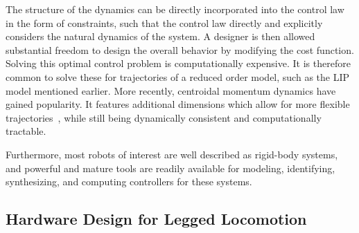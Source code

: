 The structure of the dynamics can be directly incorporated into the control law in the form of constraints, such that the control law directly and explicitly considers the natural dynamics of the system.
A designer is then allowed substantial freedom to design the overall behavior by modifying the cost function.
Solving this optimal control problem is computationally expensive. It is therefore common to solve these for trajectories of a reduced order model, such as the LIP model mentioned earlier. More recently, centroidal momentum dynamics have gained popularity. It features additional dimensions which allow for more flexible trajectories~\cite{dai2014whole,koolen2016balance,ponton2016convex}, while still being dynamically consistent and computationally tractable.

Furthermore, most robots of interest are well described as rigid-body systems, and powerful and mature tools are readily available for modeling, identifying, synthesizing, and computing controllers for these systems.


\subsection{Hardware Design for Legged Locomotion}

